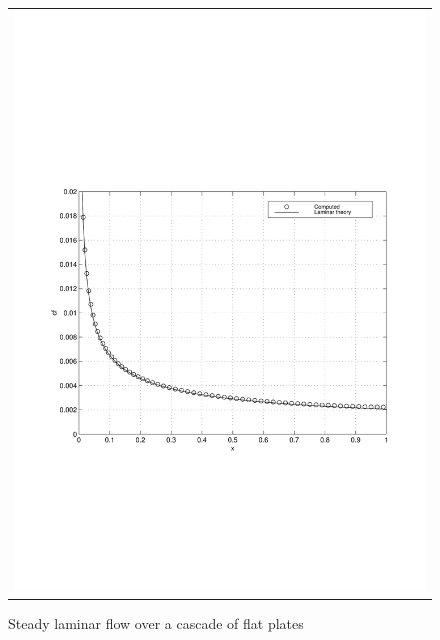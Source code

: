 \begin{figure}
\begin{center}
\begin{tabular}{c}
{        \includegraphics[width=110mm,clip=t]{CHAP_LINEAR/FIGURE/flat_laminar_cff.pdf}}
   \end{tabular}
 \end{center}
 \vspace{-7mm}
 \caption{Steady laminar flow over a cascade of flat plates}
 \label{flat_laminar_steady.fig}
\end{figure}
%
